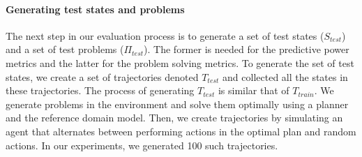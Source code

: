 \documentclass{article}
\theoremstyle{definition}
\theoremstyle{remark}
\newcommand{\stest}{\ensuremath{S_{\textit{test}}}\xspace}
\newcommand{\ptest}{\ensuremath{\Pi_{\textit{test}}}\xspace}
\newcommand{\T}{T}
\newcommand{\Ttrain}{\T_{train}}
\newcommand{\Ttest}{\T_{test}}
\newif\ifaddcomments
\newcommand{\roni}[1]{\ifaddcomments{\textcolor{red}{[Roni: #1]}}\fi}
\newcommand{\leo}[1]{\ifaddcomments{\textcolor{pink}{[Leonardo: #1]}}\fi}
\begin{document}
%



\paragraph{Generating test states and problems}
The next step in our evaluation process is to generate a set of test states ($\stest$) and a set of test problems ($\ptest$). The former is needed for the predictive power metrics and the latter for the problem solving metrics. 
To generate the set of test states, we create a set of trajectories denoted $\Ttest$ and collected all the states in these trajectories. 
The process of generating $\Ttest$ is similar that of $\Ttrain$. 
We generate problems in the environment and solve them optimally using a planner and the reference domain model. \roni{Why did we choose optimally here and not like we did for generating $\Ttrain$?} \leo{to better balance the samples for actions that are not necessarily executed in heuristic plans. The similarity with the previous barman example is to obtain a number of samples of \textsc{refill} closer to other actions}
Then, we create trajectories by simulating an agent that alternates between performing actions in the optimal plan and random actions. 
In our experiments, we generated 100 such trajectories. 






\end{document}
